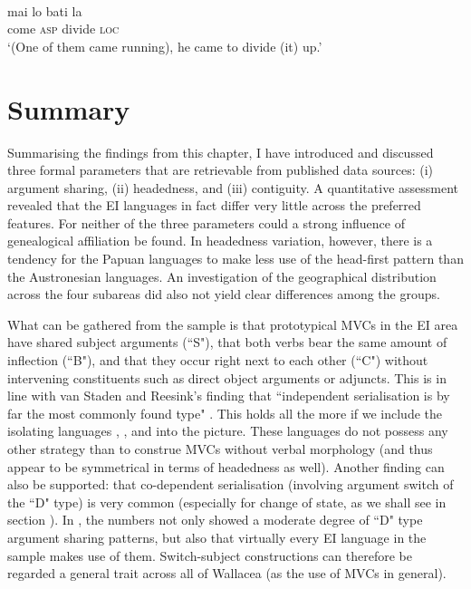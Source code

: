 \ea \label{waimaqa_come}
\\
\gll mai lo bati la \\
come \textsc{asp} divide \textsc{loc} \\
\glft `(One of them came running), he came to divide (it) up.'\\ 
\z

\section{Summary}

Summarising the findings from this chapter, I have introduced and discussed three formal parameters that are retrievable from published data sources: (i) argument sharing, (ii) headedness, and (iii) contiguity. A quantitative assessment revealed that the EI languages in fact differ very little across the preferred features. For neither of the three parameters could a strong influence of genealogical affiliation be found. In headedness variation, however, there is a tendency for the Papuan languages to make less use of the head-first pattern than the Austronesian languages. An investigation of the geographical distribution across the four subareas did also not yield clear differences among the groups.

What can be gathered from the sample is that prototypical MVCs in the EI area have shared subject arguments (``S"), that both verbs bear the same amount of inflection (``B"), and that they occur right next to each other (``C") without intervening constituents such as direct object arguments or adjuncts. This is in line with van Staden and Reesink's finding that ``independent serialisation is by far the most commonly found type" \citep[48]{vanstaden2008serial}. This holds all the more if we include the isolating languages , , and  into the picture. These languages do not possess any other strategy than to construe MVCs without verbal morphology (and thus appear to be symmetrical in terms of headedness as well). Another finding can also be supported: that co-dependent serialisation (involving argument switch of the ``D" type) is very common (especially for change of state, as we shall see in section ). In , the numbers not only showed a moderate degree of ``D" type argument sharing patterns, but also that virtually every EI language in the sample makes use of them. Switch-subject constructions can therefore be regarded a general trait across all of Wallacea (as the use of MVCs in general).

